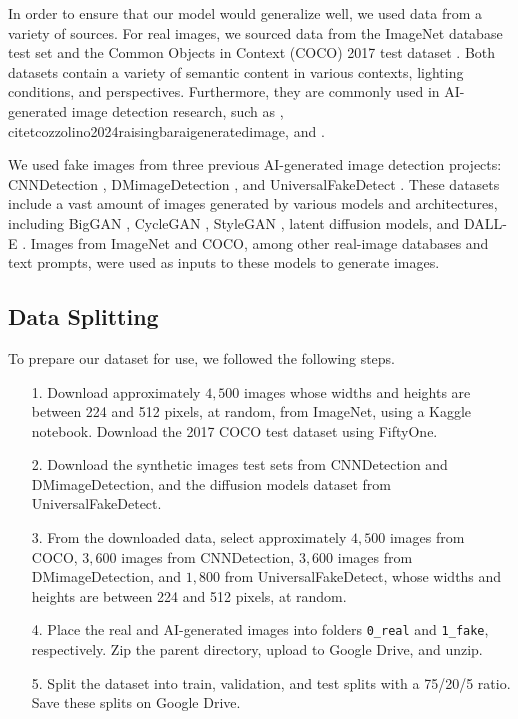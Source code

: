 \documentclass{article} %
\begin{document}
In order to ensure that our model would generalize well, we used data from a variety of sources. For real images, we sourced data from the ImageNet database test set \citep{5206848} and the Common Objects in Context (COCO) 2017 test dataset \citep{lin2015microsoft}. Both datasets contain a variety of semantic content in various contexts, lighting conditions, and perspectives. Furthermore, they are commonly used in AI-generated image detection research, such as \citet{cozzolino2024zeroshotdetectionaigeneratedimages}, citet{cozzolino2024raisingbaraigeneratedimage}, and \citet{radford2021learningtransferablevisualmodels}.

We used fake images from three previous AI-generated image detection projects: CNNDetection
\citep{wang2020cnngeneratedimagessurprisinglyeasy}, DMimageDetection \citep{corvi2022detectionsyntheticimagesgenerated}, and UniversalFakeDetect
\citep{ojha2024universalfakeimagedetectors}. These datasets include a vast amount of images generated by various models and architectures, including BigGAN \citep{brock2019largescalegantraining}, CycleGAN \citep{zhu2020unpairedimagetoimagetranslationusing}, StyleGAN \citep{karras2020analyzingimprovingimagequality}, latent diffusion models, and DALL-E \citep{dall-e}. Images from ImageNet and COCO, among other real-image databases and text prompts, were used as inputs to these models to generate images.

\subsection{Data Splitting}

To prepare our dataset for use, we followed the following steps.
\begin{enumerate}
    \item[1.] Download approximately $4,500$ images whose widths and heights are between 224 and 512 pixels, at random, from ImageNet, using a Kaggle notebook. Download the 2017 COCO test dataset using FiftyOne.
    \item[2.] Download the synthetic images test sets from CNNDetection and DMimageDetection, and the diffusion models dataset from UniversalFakeDetect.
    \item[3.] From the downloaded data, select approximately $4,500$ images from COCO, $3,600$ images from CNNDetection, $3,600$ images from DMimageDetection, and $1,800$ from UniversalFakeDetect, whose widths and heights are between 224 and 512 pixels, at random.
    \item[4.] Place the real and AI-generated images into folders \texttt{0\_real} and \texttt{1\_fake}, respectively. Zip the parent directory, upload to Google Drive, and unzip.
    \item[5.] Split the dataset into train, validation, and test splits with a 75/20/5 ratio. Save these splits on Google Drive.
\end{enumerate}
\end{document}
